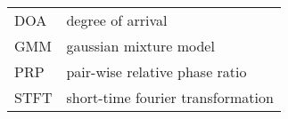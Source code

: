 \begin{tabular}{p{6cm}l}
DOA			&	degree of arrival\\
GMM         &   gaussian mixture model\\
PRP         &   pair-wise relative phase ratio\\
STFT        &   short-time fourier transformation\\
\end{tabular}
